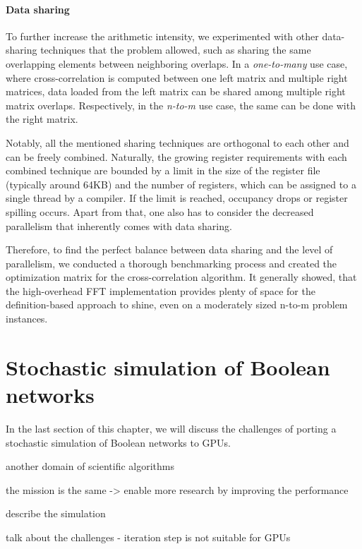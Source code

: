 \paragraph{Data sharing} To further increase the arithmetic intensity, we experimented with other data-sharing techniques that the problem allowed, such as sharing the same overlapping elements between neighboring overlaps. In a \emph{one-to-many} use case, where cross-correlation is computed between one left matrix and multiple right matrices, data loaded from the left matrix can be shared among multiple right matrix overlaps. Respectively, in the \emph{n-to-m} use case, the same can be done with the right matrix. 

Notably, all the mentioned sharing techniques are orthogonal to each other and can be freely combined. Naturally, the growing register requirements with each combined technique are bounded by a limit in the size of the register file (typically around 64KB) and the number of registers, which can be assigned to a single thread by a compiler. If the limit is reached, occupancy drops or register spilling occurs. Apart from that, one also has to consider the decreased parallelism that inherently comes with data sharing.

Therefore, to find the perfect balance between data sharing and the level of parallelism, we conducted a thorough benchmarking process and created the optimization matrix for the cross-correlation algorithm. It generally showed, that the high-overhead FFT implementation provides plenty of space for the definition-based approach to shine, even on a moderately sized n-to-m problem instances.


\section{Stochastic simulation of Boolean networks}

In the last section of this chapter, we will discuss the challenges of porting a stochastic simulation of Boolean networks to GPUs. 

another domain of scientific algorithms

the mission is the same -> enable more research by improving the performance

describe the simulation

talk about the challenges  
- iteration step is not suitable for GPUs 










